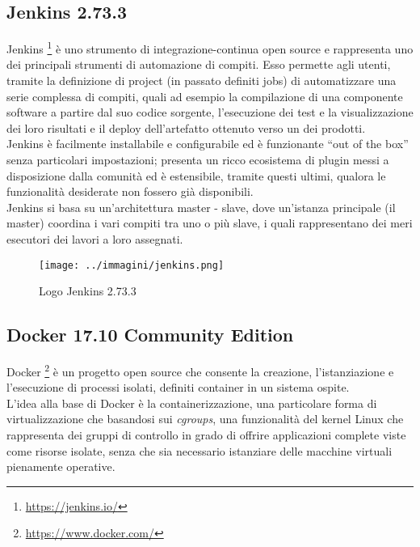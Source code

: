 \subsection{Jenkins 2.73.3}

Jenkins \footnote{\url{https://jenkins.io/}} è uno strumento di \gls{integrazione-continua} open source e rappresenta uno dei principali strumenti di automazione di compiti. Esso permette agli utenti, tramite la definizione di \gls{project} (in passato definiti jobs) di automatizzare una serie complessa di compiti, quali ad esempio la compilazione di una componente software a partire dal suo codice sorgente, l'esecuzione dei test e la visualizzazione dei loro risultati e il \gls{deploy} dell'\gls{artefatto} ottenuto verso un  dei prodotti.\\

Jenkins è facilmente installabile e configurabile ed è funzionante ``out of the box'' senza particolari impostazioni; presenta un ricco ecosistema di \gls{plugin} messi a disposizione dalla comunità ed è estensibile, tramite questi ultimi, qualora le funzionalità desiderate non fossero già disponibili.\\

Jenkins si basa su un'architettura \gls{master} - \gls{slave}, dove un'istanza principale (il \gls{master}) coordina i vari compiti tra uno o più \gls{slave}, i quali rappresentano dei meri esecutori dei lavori a loro assegnati.

\begin{figure}[H]
    \capstart
    \centering
    \texttt{[image: ../immagini/jenkins.png]}
    \caption{Logo Jenkins 2.73.3}
\end{figure}

\subsection{Docker 17.10 Community Edition}

Docker \footnote{\url{https://www.docker.com/}} è un progetto open source che consente la creazione, l'istanziazione e l'esecuzione di processi isolati, definiti \gls{container} in un sistema ospite. \\

L'idea alla base di Docker è la containerizzazione, una particolare forma di virtualizzazione che basandosi sui \textit{cgroups}, una funzionalità del kernel \gls{Linux} che rappresenta dei gruppi di controllo in grado di offrire applicazioni complete viste come risorse isolate, senza che sia necessario istanziare delle macchine virtuali pienamente operative. \\

